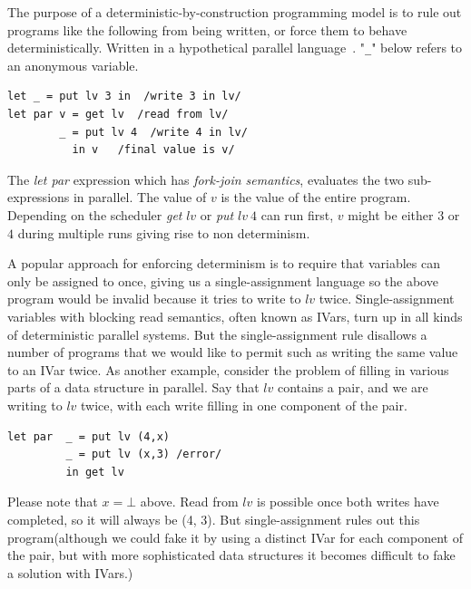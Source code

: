 \documentclass[twocolumn]{article}
\begin{document}
The purpose of a deterministic-by-construction programming model is to rule out programs like the following from being written, or force them to behave deterministically. Written in a hypothetical parallel language~\cite{lindsey}. "\texttt{\_}" below refers to an anonymous variable.
\begin{verbatim}
let _ = put lv 3 in  /write 3 in lv/
let par v = get lv  /read from lv/
        _ = put lv 4  /write 4 in lv/
	      in v   /final value is v/
\end{verbatim} 
The \textit{let par} expression which has \textit{fork-join semantics}, evaluates the two sub-expressions in parallel. The value of $v$ is the value of the entire program. Depending on the scheduler \textit{get} $lv$ or \textit{put} $lv\ 4$ can run first, $v$ might be either $3$ or $4$ during multiple runs giving rise to non determinism.\par
A popular approach for enforcing determinism is to require that variables can only be assigned to once, giving us a single-assignment language so the above program would be invalid because it tries to write to $lv$ twice. Single-assignment variables with blocking read semantics, often known as IVars, turn up in all kinds of deterministic parallel systems. But the single-assignment rule disallows a number of programs that we would like to permit such as writing the same value to an IVar twice. As another example, consider the problem of filling in various parts of a data structure in parallel. \cite{lindsey}Say that $lv$ contains a pair, and we are writing to $lv$ twice, with each write filling in one component of the pair. 
\begin{verbatim}
let par  _ = put lv (4,x)
         _ = put lv (x,3) /error/
         in get lv
\end{verbatim}  
Please note that $x=\bot$ above. Read from $lv$ is possible once both writes have completed, so it will always be (4, 3). But single-assignment rules out this program(although we could fake it by using a distinct IVar for each component of the pair, but with more sophisticated data structures it becomes difficult to fake a solution with IVars.)\par
\end{document}
